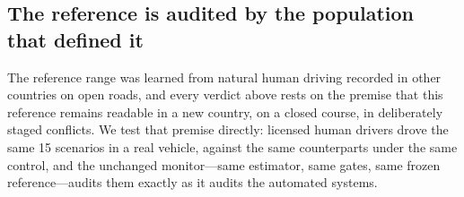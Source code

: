 \documentclass[12pt,a4paper]{article}
\begin{document}
\subsection{The reference is audited by the population that defined it}
The reference range was learned from natural human driving recorded in other countries on open
roads, and every verdict above rests on the premise that this reference remains readable in a new
country, on a closed course, in deliberately staged conflicts. We test that premise directly:
licensed human drivers drove the same 15 scenarios in a real vehicle, against the same
counterparts under the same control, and the unchanged monitor---same estimator, same gates, same frozen
reference---audits them exactly as it audits the automated systems.
\end{document}
